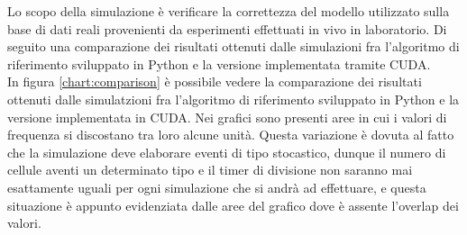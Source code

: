 Lo scopo della simulazione è verificare la correttezza del modello utilizzato
sulla base di dati reali provenienti da esperimenti effettuati in vivo
in laboratorio.
Di seguito una comparazione dei risultati ottenuti dalle simulazioni fra
l'algoritmo di riferimento sviluppato in Python e la versione implementata
tramite CUDA.
\\
In figura \ref{chart:comparison} è possibile vedere la comparazione dei
risultati ottenuti dalle simulatzioni fra l'algoritmo di riferimento sviluppato
in Python e la versione implementata in CUDA.
Nei grafici sono presenti aree in cui
i valori di frequenza si discostano tra loro alcune unità. Questa variazione
è dovuta al fatto che la simulazione deve elaborare eventi di tipo stocastico,
dunque il numero di cellule aventi un determinato tipo e il timer di divisione
non saranno mai esattamente uguali per ogni simulazione che si andrà ad
effettuare, e questa situazione è appunto evidenziata dalle aree del grafico
dove è assente l'overlap dei valori. 
